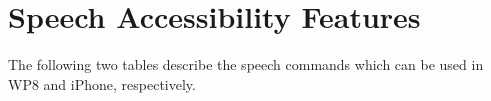 \chapter{Speech Accessibility Features}
The following two tables describe the speech commands which can be used in WP8 and iPhone, respectively.


